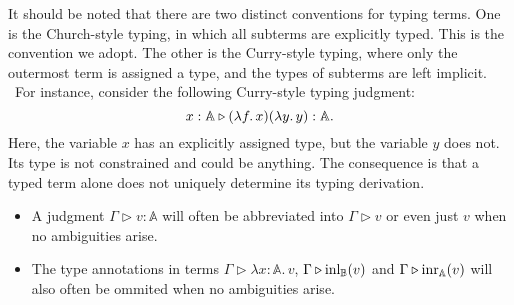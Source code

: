 \begin{example}
It should be noted that there are two distinct conventions for typing terms. One is the Church-style typing, in which all subterms are explicitly typed. This is the convention we adopt. The other is the Curry-style typing, where only the outermost term is assigned a type, and the types of subterms are left implicit.  For instance, consider the following Curry-style typing judgment:
\[
x : \mathbb{A} \triangleright (\lambda f.\,x)(\lambda y.\,y) : \mathbb{A}.
\]
Here, the variable $x$ has an explicitly assigned type, but the variable $y$ does not. Its type is not constrained and could be anything. The consequence is that a typed term alone does not uniquely determine its typing derivation.

\begin{convention}
  \begin{itemize}
    \item A judgment $\Gamma \triangleright v: \mathbb{A}$ will often be abbreviated into $\Gamma \triangleright v $ or even just $v$ when no ambiguities arise.
    \item The type annotations in terms $\Gamma \triangleright \lambda x:\mathbb{A} . \, v$, $\Gamma \triangleright \mathrm{inl}_{\mathbb{B}}(v)$ and $\Gamma \triangleright \mathrm{inr}_{\mathbb{A}}(v)$ will also often be ommited when no ambiguities arise.
  \end{itemize}
\end{convention}




\end{example}

